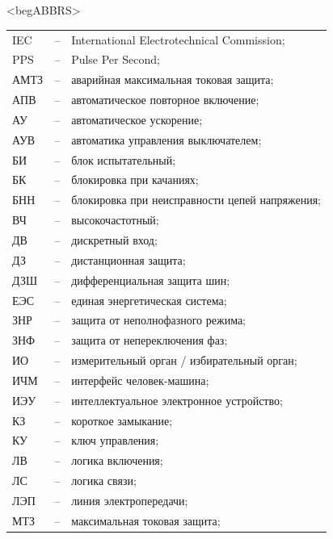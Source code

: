 \color{unimain}\section*{}
{\color{white}\fontsize{0.1pt}{0.1pt}\selectfont<begABBRS>}
\color{black}
\begin{longtable}{>{\raggedright\arraybackslash}m{2cm}>{\raggedright\arraybackslash}m{0.5cm}>{\raggedright\arraybackslash}m{20cm}}
\endfirsthead\endhead\endfoot\endlastfoot
IEC & -- &  International Electrotechnical Commission; \\
PPS & -- & Pulse Per Second; \\
АМТЗ & -- & аварийная максимальная токовая защита; \\
АПВ & -- & автоматическое повторное включение; \\
АУ & -- & автоматическое ускорение; \\
АУВ & -- & автоматика управления выключателем; \\
БИ & -- & блок испытательный; \\
БК & -- & блокировка при качаниях; \\
БНН & -- & блокировка при неисправности цепей напряжения; \\
ВЧ & -- & высокочастотный; \\
ДВ & -- & дискретный вход; \\
ДЗ & -- & дистанционная защита; \\
ДЗШ & -- & дифференциальная защита шин; \\
ЕЭС & -- & единая энергетическая система; \\
ЗНР & -- & защита от неполнофазного режима; \\
ЗНФ & -- & защита от непереключения фаз; \\
ИО & -- & измерительный орган / избирательный орган; \\
ИЧМ & -- & интерфейс человек-машина; \\
ИЭУ & -- & интеллектуальное электронное устройство; \\
КЗ & -- & короткое замыкание; \\
КУ & -- & ключ управления; \\
ЛВ & -- & логика включения; \\
ЛС & -- & логика связи; \\
ЛЭП & -- & линия электропередачи; \\
МТЗ & -- & максимальная токовая защита; \\

\end{longtable}
